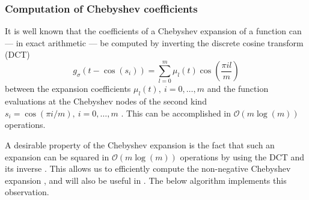 

\subsubsection{Computation of Chebyshev coefficients}
\label{subsubsec:dct}

It is well known that the coefficients of a Chebyshev expansion of a function can --- in exact arithmetic --- be computed by inverting the discrete cosine transform (DCT)
\begin{equation}
    g_{\sigma}(t - \cos(s_i)) = \sum_{l=0}^{m} \mu_l(t) \cos\left(\frac{\pi i l}{m} \right)
    \label{equ:discrete-cosine-transform}
\end{equation}
between the expansion coefficients $\mu_l(t),~i=0,\dots,m$ and the function evaluations at the Chebyshev nodes of the second kind $s_i = \cos(\pi i / m),~i=0,\dots,m$ \cite{vanloan-1992-computational-frameworks, baszenski-1997-fast-polynomial}. This can be accomplished in $\mathcal{O}(m \log(m))$ operations.

A desirable property of the Chebyshev expansion is the fact that such an expansion can be squared in $\mathcal{O}(m \log(m))$ operations by using the DCT and its inverse \cite{baszenski-1997-fast-polynomial}. This allows us to efficiently compute the non-negative Chebyshev expansion , and will also be useful in . The below algorithm implements this observation.

